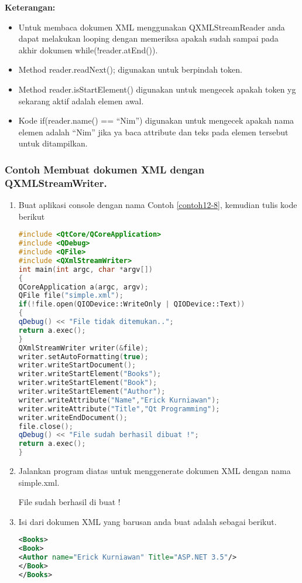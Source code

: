 \textbf{Keterangan:}

\begin{itemize}

\item
  Untuk membaca dokumen XML menggunakan QXMLStreamReader anda dapat
  melakukan looping dengan memeriksa apakah sudah sampai pada akhir
  dokumen while(!reader.atEnd()).
\item
  Method reader.readNext(); digunakan untuk berpindah token.
\item
  Method reader.isStartElement() digunakan untuk mengecek apakah token
  yg sekarang aktif adalah elemen awal.
\item
  Kode if(reader.name() == ``Nim'') digunakan untuk mengecek apakah nama
  elemen adalah ``Nim'' jika ya baca attribute dan teks pada elemen
  tersebut untuk ditampilkan.
\end{itemize}

\subsubsection*{Contoh  Membuat dokumen XML dengan QXMLStreamWriter.}

\begin{enumerate}

\item
  Buat aplikasi console dengan nama Contoh \ref{contoh12-8}, kemudian tulis kode
  berikut

\begin{lstlisting}[language=c++, caption=Membuat dokumen XML dengan QXMLStreamWriter, label=contoh12-8]
#include <QtCore/QCoreApplication>
#include <QDebug>
#include <QFile>
#include <QXmlStreamWriter>
int main(int argc, char *argv[])
{
QCoreApplication a(argc, argv);
QFile file("simple.xml");
if(!file.open(QIODevice::WriteOnly | QIODevice::Text))
{
qDebug() << "File tidak ditemukan..";
return a.exec();
}
QXmlStreamWriter writer(&file);
writer.setAutoFormatting(true);
writer.writeStartDocument();
writer.writeStartElement("Books");
writer.writeStartElement("Book");
writer.writeStartElement("Author");
writer.writeAttribute("Name","Erick Kurniawan");
writer.writeAttribute("Title","Qt Programming");
writer.writeEndDocument();
file.close();
qDebug() << "File sudah berhasil dibuat !";
return a.exec();
}
\end{lstlisting}
\item
  Jalankan program diatas untuk menggenerate dokumen XML dengan nama
  simple.xml.
  \begin{lcverbatim}
File sudah berhasil di buat !
  \end{lcverbatim}
\item
  Isi dari dokumen XML yang barusan anda buat adalah sebagai berikut.

\begin{lstlisting}[language=xml]
<Books>
<Book>
<Author name="Erick Kurniawan" Title="ASP.NET 3.5"/>
</Book>
</Books>
\end{lstlisting}

\end{enumerate}

